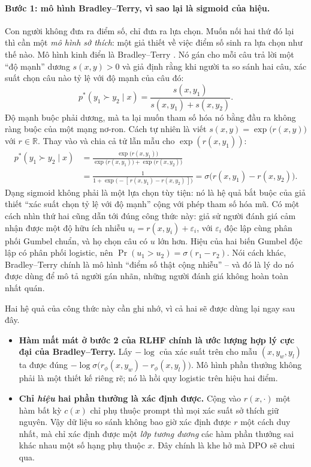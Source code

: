 \paragraph{Bước 1: mô hình Bradley--Terry, vì sao lại là sigmoid của hiệu.}
Con người không đưa ra điểm số, chỉ đưa ra lựa chọn. Muốn nối hai thứ đó lại thì cần một \emph{mô hình sở thích}: một giả thiết về việc điểm số sinh ra lựa chọn như thế nào. Mô hình kinh điển là Bradley--Terry \cite{bradley1952rank}. Nó gán cho mỗi câu trả lời một ``độ mạnh'' dương \( s(x,y) > 0 \) và giả định rằng khi người ta so sánh hai câu, xác suất chọn câu nào tỷ lệ với độ mạnh của câu đó:
\[
    p^{*}(y_1 \succ y_2 \mid x) = \frac{s(x,y_1)}{s(x,y_1) + s(x,y_2)} .
\]
Độ mạnh buộc phải dương, mà ta lại muốn tham số hóa nó bằng đầu ra không ràng buộc của một mạng nơ-ron. Cách tự nhiên là viết \( s(x,y) = \exp\big(r(x,y)\big) \) với \( r \in \mathbb{R} \). Thay vào và chia cả tử lẫn mẫu cho \( \exp(r(x,y_1)) \):
\[
\begin{aligned}
    p^{*}(y_1 \succ y_2 \mid x)
    &= \frac{\exp\big(r(x,y_1)\big)}{\exp\big(r(x,y_1)\big) + \exp\big(r(x,y_2)\big)} \\[4pt]
    &= \frac{1}{1 + \exp\big(-[\,r(x,y_1) - r(x,y_2)\,]\big)}
    = \sigma\big(r(x,y_1) - r(x,y_2)\big).
\end{aligned}
\]
Dạng sigmoid không phải là một lựa chọn tùy tiện: nó là hệ quả bắt buộc của giả thiết ``xác suất chọn tỷ lệ với độ mạnh'' cộng với phép tham số hóa mũ. Có một cách nhìn thứ hai cũng dẫn tới đúng công thức này: giả sử người đánh giá cảm nhận được một độ hữu ích nhiễu \( u_i = r(x,y_i) + \varepsilon_i \), với \( \varepsilon_i \) độc lập cùng phân phối Gumbel chuẩn, và họ chọn câu có \( u \) lớn hơn. Hiệu của hai biến Gumbel độc lập có phân phối logistic, nên \( \Pr(u_1 > u_2) = \sigma(r_1 - r_2) \). Nói cách khác, Bradley--Terry chính là mô hình ``điểm số thật cộng nhiễu'' -- và đó là lý do nó được dùng để mô tả người gán nhãn, những người đánh giá không hoàn toàn nhất quán.

Hai hệ quả của công thức này cần ghi nhớ, vì cả hai sẽ được dùng lại ngay sau đây.
\begin{itemize}
    \item \textbf{Hàm mất mát ở bước 2 của RLHF chính là ước lượng hợp lý cực đại của Bradley--Terry.} Lấy \( -\log \) của xác suất trên cho mẫu \( (x, y_w, y_l) \) ta được đúng \( -\log\sigma\big(r_\phi(x,y_w) - r_\phi(x,y_l)\big) \). Mô hình phần thưởng không phải là một thiết kế riêng rẽ; nó là hồi quy logistic trên hiệu hai điểm.
    \item \textbf{Chỉ \emph{hiệu} hai phần thưởng là xác định được.} Cộng vào \( r(x,\cdot) \) một hàm bất kỳ \( c(x) \) chỉ phụ thuộc prompt thì mọi xác suất sở thích giữ nguyên. Vậy dữ liệu so sánh không bao giờ xác định được \( r \) một cách duy nhất, mà chỉ xác định được một \emph{lớp tương đương} các hàm phần thưởng sai khác nhau một số hạng phụ thuộc \( x \). Đây chính là khe hở mà DPO sẽ chui qua.
\end{itemize}

